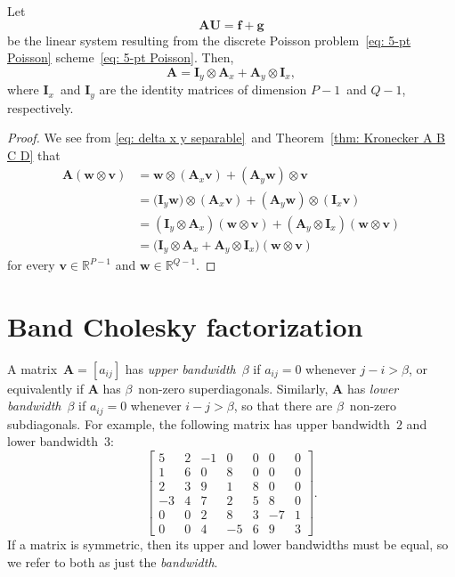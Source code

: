 \begin{theorem}
Let
\[
\boldsymbol{A}\boldsymbol{U}=\boldsymbol{f}+\boldsymbol{g}
\]
be the linear system resulting from the discrete Poisson 
problem~\eqref{eq: 5-pt Poisson} scheme~\eqref{eq: 5-pt Poisson}.  Then,
\[
\boldsymbol{A}=\boldsymbol{I}_y\otimes\boldsymbol{A}_x
    +\boldsymbol{A}_y\otimes\boldsymbol{I}_x,
\]
where $\boldsymbol{I}_x$~and $\boldsymbol{I}_y$ are the identity matrices of 
dimension $P-1$~and $Q-1$, respectively.
\end{theorem}
\begin{proof}
We see from \eqref{eq: delta x y separable}~and 
Theorem~\ref{thm: Kronecker A B C D} that
\begin{align*}
\boldsymbol{A}(\boldsymbol{w}\otimes\boldsymbol{v})
    &=\boldsymbol{w}\otimes(\boldsymbol{A}_x\boldsymbol{v})
    +(\boldsymbol{A}_y\boldsymbol{w})\otimes\boldsymbol{v}\\
    &=\bigl(\boldsymbol{I}_y\boldsymbol{w})
        \otimes(\boldsymbol{A}_x\boldsymbol{v})
    +(\boldsymbol{A}_y\boldsymbol{w})
        \otimes(\boldsymbol{I}_x\boldsymbol{v})\\
    &=(\boldsymbol{I}_y\otimes\boldsymbol{A}_x)
        (\boldsymbol{w}\otimes\boldsymbol{v})
    +(\boldsymbol{A}_y\otimes\boldsymbol{I}_x)
        (\boldsymbol{w}\otimes\boldsymbol{v})\\
    &=\bigl(\boldsymbol{I}_y\otimes\boldsymbol{A}_x
    +\boldsymbol{A}_y\otimes\boldsymbol{I}_x\bigr)
        (\boldsymbol{w}\otimes\boldsymbol{v})
\end{align*}
for every $\boldsymbol{v}\in\mathbb{R}^{P-1}$ and 
$\boldsymbol{w}\in\mathbb{R}^{Q-1}$.
\end{proof}


\section{Band Cholesky factorization}

A matrix~$\boldsymbol{A}=[a_{ij}]$ has \emph{upper bandwidth}~$\beta$ 
if $a_{ij}=0$ whenever $j-i>\beta$, or equivalently if $\boldsymbol{A}$ has 
$\beta$~non-zero superdiagonals.  Similarly, $\boldsymbol{A}$ has \emph{lower 
bandwidth}~$\beta$ if $a_{ij}=0$ whenever $i-j>\beta$, so that there are 
$\beta$~non-zero subdiagonals.  For example, the following matrix has upper 
bandwidth~$2$ and lower bandwidth~$3$:
\[
\begin{bmatrix}
 5& 2&-1& 0& 0& 0& 0\\
 1& 6& 0& 8& 0& 0& 0\\
 2& 3& 9& 1& 8& 0& 0\\
-3& 4& 7& 2& 5& 8& 0\\
 0& 0& 2& 8& 3&-7& 1\\
 0& 0& 4&-5& 6& 9& 3
\end{bmatrix}.
\]
If a matrix is symmetric, then its upper and lower bandwidths must be equal, so 
we refer to both as just the \emph{bandwidth}.

